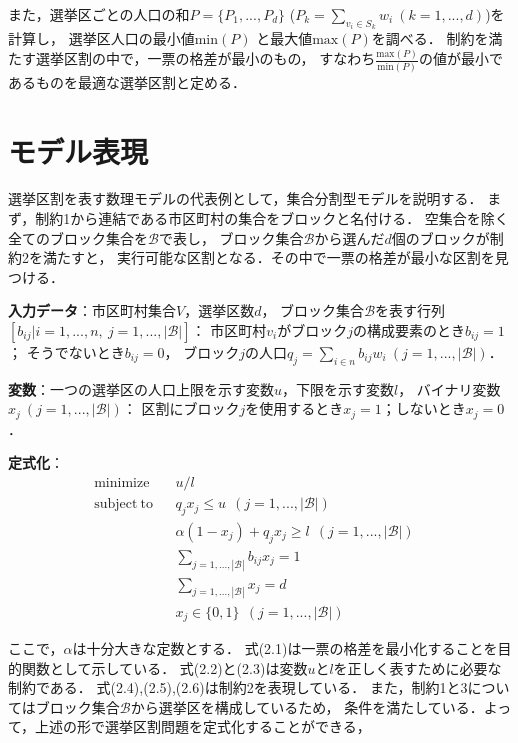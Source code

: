 また，選挙区ごとの人口の和$P=\{P_1,...,P_d\}$ ($P_k=\sum_{v_i\in S_k}w_i\ (k=1,...,d)$)を計算し，
選挙区人口の最小値$\mathrm{min}(P)$ と最大値$\mathrm{max}(P)$を調べる．
制約を満たす選挙区割の中で，一票の格差が最小のもの，
すなわち$\frac{\mathrm{max}(P)}{\mathrm{min}(P)}$の値が最小であるものを最適な選挙区割と定める．


\section{モデル表現}
選挙区割を表す数理モデルの代表例として，集合分割型モデルを説明する．
まず，制約1から連結である市区町村の集合をブロックと名付ける．
空集合を除く全てのブロック集合を$\mathscr{B}$で表し，
ブロック集合$\mathscr{B}$から選んだ$d$個のブロックが制約2を満たすと，
実行可能な区割となる．その中で一票の格差が最小な区割を見つける．

\textbf{入力データ}：市区町村集合$V$，選挙区数$d$，
ブロック集合$\mathscr{B}$を表す行列$[b_{ij}|i=1,...,n,~j=1,...,|\mathscr{B}|]$：
市区町村$v_i$がブロック$j$の構成要素のとき$b_{ij}=1$；
そうでないとき$b_{ij}=0$，
ブロック$j$の人口$q_j=\sum_{i\in n}b_{ij}w_{i}~(j=1,...,|\mathscr{B}|)$．

\textbf{変数}：一つの選挙区の人口上限を示す変数$u$，下限を示す変数$l$，
バイナリ変数$x_j~(j=1,...,|\mathscr{B}|)$：
区割にブロック$j$を使用するとき$x_j=1$；しないとき$x_j=0$．

\textbf{定式化}：
\begin{align}
    &\mathrm{minimize} && u/l && \\
    &\mathrm{subject~to} && q_jx_j\leq u~~(j=1,...,|\mathscr{B}|) && \\
    & && \alpha(1-x_j)+q_jx_j\geq l~~(j=1,...,|\mathscr{B}|) && \\
    & && \sum_{j=1,...,|\mathscr{B}|}b_{ij}x_{j}=1 && \\
    & && \sum_{j=1,...,|\mathscr{B}|}x_j=d && \\
    & && x_j \in \{0,1\}~~(j=1,...,|\mathscr{B}|) &&
\end{align}

ここで，$\alpha$は十分大きな定数とする．
式(2.1)は一票の格差を最小化することを目的関数として示している．
式(2.2)と(2.3)は変数$u$と$l$を正しく表すために必要な制約である．
式(2.4),(2.5),(2.6)は制約2を表現している．
また，制約1と3についてはブロック集合$\mathscr{B}$から選挙区を構成しているため，
条件を満たしている．よって，上述の形で選挙区割問題を定式化することができる，